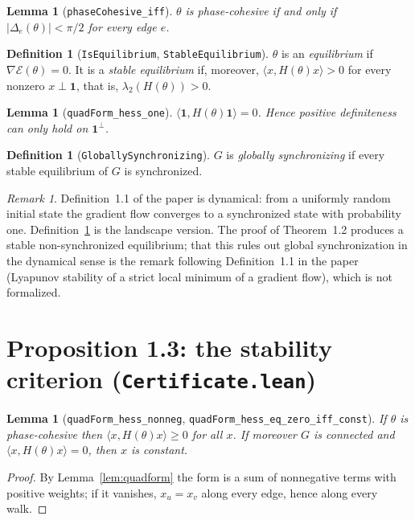 \documentclass[11pt]{amsart}
\newcommand{\leanname}[1]{\texttt{\textcolor{black!75}{#1}}}
\newcommand{\lfile}[1]{\texttt{#1}}
\newcommand{\E}{\mathcal{E}}
\newcommand{\one}{\mathbf{1}}
\theoremstyle{plain}
\newtheorem{lemma}[theorem]{Lemma}
\theoremstyle{definition}
\newtheorem{definition}[theorem]{Definition}
\theoremstyle{remark}
\newtheorem{remark}[theorem]{Remark}
\begin{document}
\begin{lemma}[\leanname{phaseCohesive\_iff}]
$\theta$ is phase-cohesive if and only if $|\Delta_e(\theta)|<\pi/2$ for every edge $e$.
\end{lemma}

\begin{definition}[\leanname{IsEquilibrium}, \leanname{StableEquilibrium}]
$\theta$ is an \emph{equilibrium} if $\nabla\E(\theta)=0$. It is a \emph{stable equilibrium} if,
moreover, $\langle x,H(\theta)x\rangle>0$ for every nonzero $x\perp\one$, that is,
$\lambda_2(H(\theta))>0$.
\end{definition}

\begin{lemma}[\leanname{quadForm\_hess\_one}]
$\langle\one,H(\theta)\one\rangle=0$. Hence positive definiteness can only hold on $\one^\perp$.
\end{lemma}

\begin{definition}[\leanname{GloballySynchronizing}]\label{def:gs}
$G$ is \emph{globally synchronizing} if every stable equilibrium of $G$ is synchronized.
\end{definition}

\begin{remark}
Definition~1.1 of the paper is dynamical: from a uniformly random initial state the gradient
flow converges to a synchronized state with probability one. Definition~\ref{def:gs} is the
landscape version. The proof of Theorem~1.2 produces a stable non-synchronized equilibrium; that
this rules out global synchronization in the dynamical sense is the remark following
Definition~1.1 in the paper (Lyapunov stability of a strict local minimum of a gradient flow),
which is not formalized.
\end{remark}

\section{Proposition 1.3: the stability criterion (\lfile{Certificate.lean})}

\begin{lemma}[\leanname{quadForm\_hess\_nonneg}, \leanname{quadForm\_hess\_eq\_zero\_iff\_const}]
If $\theta$ is phase-cohesive then $\langle x,H(\theta)x\rangle\ge0$ for all $x$. If moreover $G$
is connected and $\langle x,H(\theta)x\rangle=0$, then $x$ is constant.
\end{lemma}
\begin{proof}
By Lemma~\ref{lem:quadform} the form is a sum of nonnegative terms with positive weights; if
it vanishes, $x_u=x_v$ along every edge, hence along every walk.
\end{proof}
\end{document}
